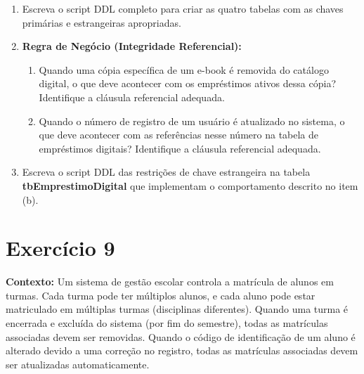 \documentclass[12pt,a4paper]{article}
\newcommand{\resposta}[1]{}
\begin{document}
\begin{enumerate}[label=\textbf{\alph*)}]
    \item Escreva o script DDL completo para criar as quatro tabelas com as chaves primárias e estrangeiras apropriadas.
    \resposta{5cm}
    
    \item \textbf{Regra de Negócio (Integridade Referencial):} 
    \begin{enumerate}[label=\arabic*.]
        \item Quando uma cópia específica de um e-book é removida do catálogo digital, o que deve acontecer com os empréstimos ativos dessa cópia? Identifique a cláusula referencial adequada.
        \item Quando o número de registro de um usuário é atualizado no sistema, o que deve acontecer com as referências nesse número na tabela de empréstimos digitais? Identifique a cláusula referencial adequada.
    \end{enumerate}
    \resposta{3cm}
    
    \item Escreva o script DDL das restrições de chave estrangeira na tabela \textbf{tbEmprestimoDigital} que implementam o comportamento descrito no item (b).
    \resposta{3cm}
\end{enumerate}
\section*{Exercício 9}

\textbf{Contexto:} Um sistema de gestão escolar controla a matrícula de alunos em turmas. Cada turma pode ter múltiplos alunos, e cada aluno pode estar matriculado em múltiplas turmas (disciplinas diferentes). Quando uma turma é encerrada e excluída do sistema (por fim do semestre), todas as matrículas associadas devem ser removidas. Quando o código de identificação de um aluno é alterado devido a uma correção no registro, todas as matrículas associadas devem ser atualizadas automaticamente.
\end{document}
